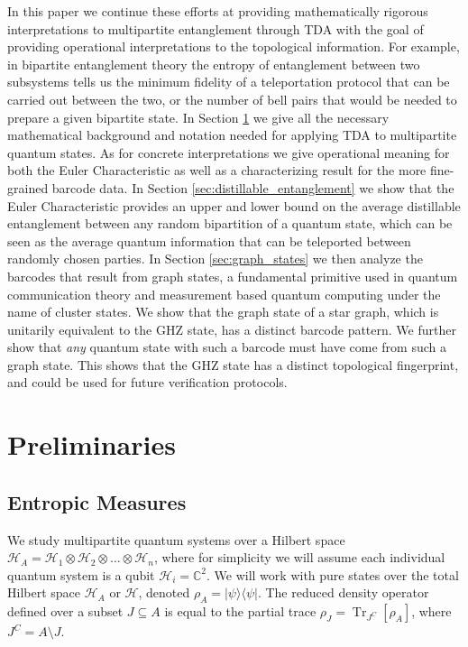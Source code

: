\documentclass{article}
\DeclareMathOperator{\Tr}{Tr}
\newcommand{\ketbra}[2]{| #1\rangle\! \langle #2|}
\newcommand{\brackets}[1]{\left[ #1 \right]}
\newcommand{\partrace}[2]{\Tr_{#1} \brackets{ #2 }}
\newcommand{\hilb}{\mathcal{H}}
\begin{document}
In this paper we continue these efforts at providing mathematically rigorous interpretations to multipartite entanglement through TDA with the goal of providing operational interpretations to the topological information. For example, in bipartite entanglement theory the entropy of entanglement between two subsystems tells us the minimum fidelity of a teleportation protocol that can be carried out between the two, or the number of bell pairs that would be needed to prepare a given bipartite state. In Section \ref{sec:prelims} we give all the necessary mathematical background and notation needed for applying TDA to multipartite quantum states. As for concrete interpretations we give operational meaning for both the Euler Characteristic as well as a characterizing result for the more fine-grained barcode data. In Section \ref{sec:distillable_entanglement} we show that the Euler Characteristic provides an upper and lower bound on the average distillable entanglement between any random bipartition of a quantum state, which can be seen as the average quantum information that can be teleported between randomly chosen parties. In Section \ref{sec:graph_states} we then analyze the barcodes that result from graph states, a fundamental primitive used in quantum communication theory and measurement based quantum computing \cite{nielsen2006} under the name of cluster states. We show that the graph state of a star graph, which is unitarily equivalent to the GHZ state, has a distinct barcode pattern. We further show that \emph{any} quantum state with such a barcode must have come from such a graph state. This shows that the GHZ state has a distinct topological fingerprint, and could be used for future verification protocols. 
 
\section{Preliminaries}\label{sec:prelims}

\subsection{Entropic Measures}
\label{subsec:entropic_measures}

We study multipartite quantum systems over a Hilbert space $\hilb_A = \hilb_{1} \otimes \hilb_{2} \otimes \ldots \otimes \hilb_{n}$, where for simplicity we will assume each individual quantum system is a qubit $\hilb_{i} = \mathbb{C}^{2}$. We will work with pure states over the total Hilbert space $\hilb_A$ or $\hilb$, denoted $\rho_A = \ketbra{\psi}{\psi}$. The reduced density operator defined over a subset $J \subseteq A$ is equal to the partial trace $\rho_J = \partrace{J^C}{\rho_A}$, where $J^C = A \setminus J$. 
\end{document}
